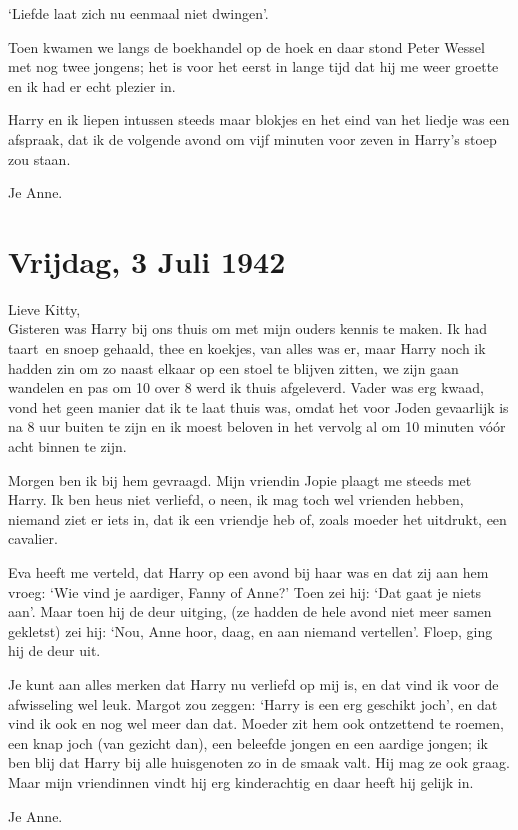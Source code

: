 \documentclass{book}
\begin{document}
`Liefde laat zich nu eenmaal niet dwingen'.

Toen kwamen we langs de boekhandel op de hoek en daar stond Peter Wessel met nog
twee jongens; het is voor het eerst in lange tijd dat hij me weer groette en ik
had er echt plezier in.

Harry en ik liepen intussen steeds maar blokjes en het eind van het liedje was
een afspraak, dat ik de volgende avond om vijf minuten voor zeven in Harry's
stoep zou staan.

Je Anne.

\section*{Vrijdag, 3 Juli 1942}

Lieve Kitty,\\
Gisteren was Harry bij ons thuis om met mijn ouders kennis te
maken. Ik had taart~en snoep gehaald, thee en koekjes, van alles was er, maar
Harry noch ik hadden zin om zo naast elkaar op een stoel te blijven zitten, we
zijn gaan wandelen en pas om 10 over 8 werd ik thuis afgeleverd. Vader was erg
kwaad, vond het geen manier dat ik te laat thuis was, omdat het voor Joden
gevaarlijk is na 8 uur buiten te zijn en ik moest beloven in het vervolg al om
10 minuten vóór acht binnen te zijn.

Morgen ben ik bij hem gevraagd. Mijn vriendin Jopie plaagt me steeds met Harry.
Ik ben heus niet verliefd, o neen, ik mag toch wel vrienden hebben, niemand ziet
er iets in, dat ik een vriendje heb of, zoals moeder het uitdrukt, een cavalier.

Eva heeft me verteld, dat Harry op een avond bij haar was en dat zij aan hem
vroeg: `Wie vind je aardiger, Fanny of Anne?' Toen zei hij: `Dat gaat je niets
aan'. Maar toen hij de deur uitging, (ze hadden de hele avond niet meer samen
gekletst) zei hij: `Nou, Anne hoor, daag, en aan niemand vertellen'. Floep, ging
hij de deur uit.

Je kunt aan alles merken dat Harry nu verliefd op mij is, en dat vind ik voor de
afwisseling wel leuk. Margot zou zeggen: `Harry is een erg geschikt joch', en
dat vind ik ook en nog wel meer dan dat. Moeder zit hem ook ontzettend te
roemen, een knap joch (van gezicht dan), een beleefde jongen en een aardige
jongen; ik ben blij dat Harry bij alle huisgenoten zo in de smaak valt. Hij mag
ze ook graag. Maar mijn vriendinnen vindt hij erg kinderachtig en daar heeft hij
gelijk in.

Je Anne.
\end{document}
